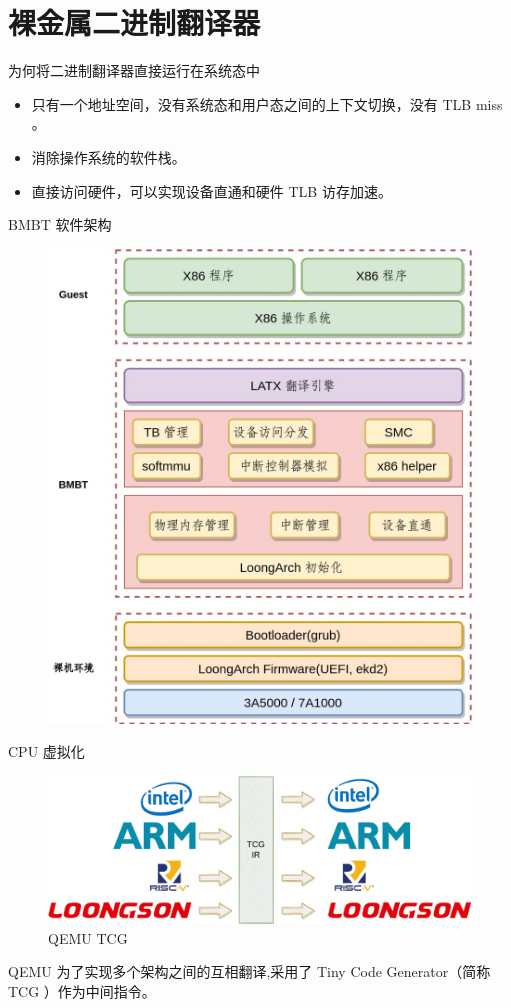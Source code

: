 \documentclass{beamer}
\begin{document}
\section{裸金属二进制翻译器}
\begin{frame}{为何将二进制翻译器直接运行在系统态中}
	\begin{itemize}
		\item 只有一个地址空间，没有系统态和用户态之间的上下文切换，没有 TLB miss 。
		\item 消除操作系统的软件栈。
		\item 直接访问硬件，可以实现设备直通和硬件 TLB 访存加速。
	\end{itemize}
\end{frame}

\begin{frame}{BMBT 软件架构}
	\begin{figure}
		\includegraphics[width=0.6\linewidth]{../paper/images/bmbt.jpg}
	\end{figure}
\end{frame}


\begin{frame}{CPU 虚拟化}
	\begin{figure}
		\includegraphics[width=\linewidth]{../paper/images/tcg.jpg}
		\caption{QEMU TCG}
	\end{figure}
	QEMU 为了实现多个架构之间的互相翻译,采用了 Tiny Code Generator（简称 TCG ）作为中间指令。
\end{frame}
\end{document}
